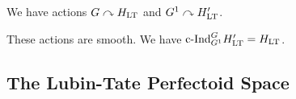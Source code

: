 \documentclass[../main.tex]{subfiles}
\begin{document}
We have actions $G \curvearrowright H_{\mathrm{LT}}$ and $G^1 \curvearrowright H_{\mathrm{LT}}'$. 
\begin{lem}\label{lem:GActsSmoothly}
  These actions are smooth. We have $\mathrm{c\text{-}Ind}_{G^1}^G H_{\mathrm{LT}}' = H_{\mathrm{LT}}$.
\end{lem}


\subsection{The Lubin-Tate Perfectoid Space} %
\label{sub:The Lubin-Tate Perfectoid Space}


\end{document}
